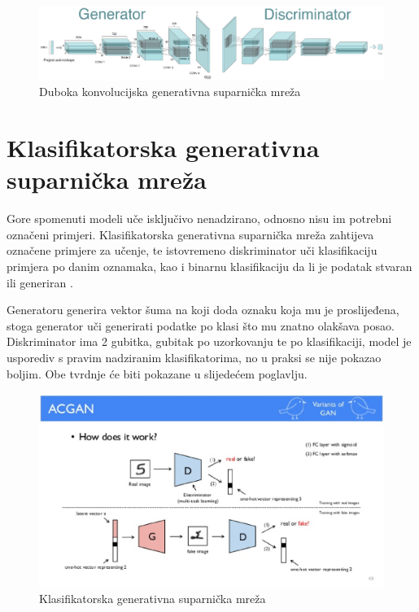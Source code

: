 \documentclass[times, utf8, diplomski]{fer}
\begin{document}
\begin{figure}[htbp]
    \centering
    \includegraphics[scale=0.4]{Slike/dcgan}
    \caption{Duboka konvolucijska generativna suparnička mreža \cite{dcgan}}
\end{figure}

\section{Klasifikatorska generativna suparnička mreža}
Gore spomenuti modeli uče isključivo nenadzirano, odnosno nisu im potrebni označeni primjeri. Klasifikatorska generativna suparnička mreža zahtijeva označene primjere za učenje, te istovremeno diskriminator uči klasifikaciju primjera po danim oznamaka, kao i binarnu klasifikaciju da li je podatak stvaran ili generiran \cite{acgan}. \par

Generatoru generira vektor šuma na koji doda oznaku koja mu je proslijeđena, stoga generator uči generirati podatke po klasi što mu znatno olakšava posao. Diskriminator ima 2 gubitka, gubitak po uzorkovanju te po klasifikaciji, model je usporediv s pravim nadziranim klasifikatorima, no u praksi se nije pokazao boljim. Obe tvrdnje će biti pokazane u slijedećem poglavlju. \par

\begin{figure}[htbp]
    \centering
    \includegraphics[scale=0.6]{Slike/acgan}
    \caption{Klasifikatorska generativna suparnička mreža \cite{acgansketch}}
\end{figure}
\end{document}
